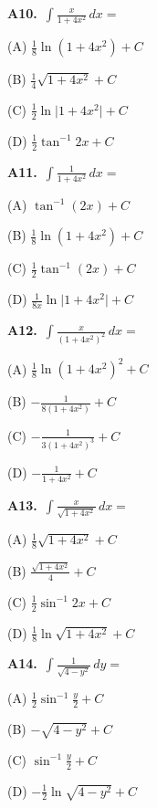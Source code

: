 \documentclass[11pt]{article}
\begin{document}
\bigskip\noindent\textbf{A10.}\ $\displaystyle\int \frac{x}{1+4x^2}\,dx=$
\begin{list}{}{\setlength{\leftmargin}{3em}\setlength{\labelwidth}{2.5em}\setlength{\itemsep}{0pt}\setlength{\topsep}{2pt}}
\item[(A)] $\frac18\ln(1+4x^2)+C$
\item[(B)] $\frac14\sqrt{1+4x^2}+C$
\item[(C)] $\frac12\ln\lvert1+4x^2\rvert+C$
\item[(D)] $\frac12\tan^{-1}2x+C$
\end{list}

\bigskip\noindent\textbf{A11.}\ $\displaystyle\int \frac1{1+4x^2}\,dx=$
\begin{list}{}{\setlength{\leftmargin}{3em}\setlength{\labelwidth}{2.5em}\setlength{\itemsep}{0pt}\setlength{\topsep}{2pt}}
\item[(A)] $\tan^{-1}(2x)+C$
\item[(B)] $\frac18\ln(1+4x^2)+C$
\item[(C)] $\frac12\tan^{-1}(2x)+C$
\item[(D)] $\frac1{8x}\ln\lvert1+4x^2\rvert+C$
\end{list}

\bigskip\noindent\textbf{A12.}\ $\displaystyle\int \frac{x}{(1+4x^2)^2}\,dx=$
\begin{list}{}{\setlength{\leftmargin}{3em}\setlength{\labelwidth}{2.5em}\setlength{\itemsep}{0pt}\setlength{\topsep}{2pt}}
\item[(A)] $\frac18\ln(1+4x^2)^2+C$
\item[(B)] $-\frac1{8(1+4x^2)}+C$
\item[(C)] $-\frac1{3(1+4x^2)^3}+C$
\item[(D)] $-\frac1{1+4x^2}+C$
\end{list}

\bigskip\noindent\textbf{A13.}\ $\displaystyle\int \frac{x}{\sqrt{1+4x^2}}\,dx=$
\begin{list}{}{\setlength{\leftmargin}{3em}\setlength{\labelwidth}{2.5em}\setlength{\itemsep}{0pt}\setlength{\topsep}{2pt}}
\item[(A)] $\frac18\sqrt{1+4x^2}+C$
\item[(B)] $\frac{\sqrt{1+4x^2}}4+C$
\item[(C)] $\frac12\sin^{-1}2x+C$
\item[(D)] $\frac18\ln\sqrt{1+4x^2}+C$
\end{list}

\bigskip\noindent\textbf{A14.}\ $\displaystyle\int \frac1{\sqrt{4-y^2}}\,dy=$
\begin{list}{}{\setlength{\leftmargin}{3em}\setlength{\labelwidth}{2.5em}\setlength{\itemsep}{0pt}\setlength{\topsep}{2pt}}
\item[(A)] $\frac12\sin^{-1}\frac y2+C$
\item[(B)] $-\sqrt{4-y^2}+C$
\item[(C)] $\sin^{-1}\frac y2+C$
\item[(D)] $-\frac12\ln\sqrt{4-y^2}+C$
\end{list}
\end{document}
